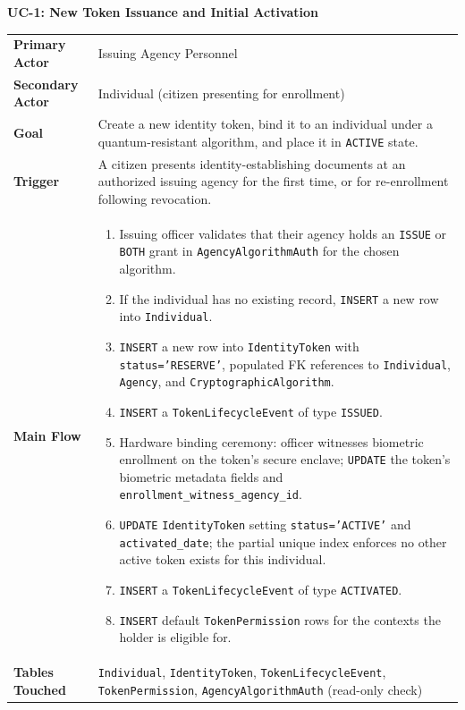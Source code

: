 \documentclass[11pt,letterpaper]{article}
\newcommand{\entity}[1]{\texttt{\color{navydark}#1}}
\newcommand{\usecase}[2]{%
  \needspace{3\baselineskip}%
  \vspace{6pt}%
  \noindent\colorbox{tabheader}{\parbox{\dimexpr\textwidth-2\fboxsep}{%
    \color{white}\small\bfseries\textsc{#1:} \mdseries #2}}%
  \nopagebreak[4]%
  \vspace{2pt}%
  \nopagebreak[4]%
}
\begin{document}
\usecase{UC-1}{New Token Issuance and Initial Activation}
\noindent\begin{xltabular}{\textwidth}{>{\bfseries}p{1.4in} >{\RaggedRight\arraybackslash}X}
Primary Actor & Issuing Agency Personnel \\
Secondary Actor & Individual (citizen presenting for enrollment) \\
Goal & Create a new identity token, bind it to an individual under a quantum-resistant algorithm, and place it in \texttt{ACTIVE} state. \\
Trigger & A citizen presents identity-establishing documents at an authorized issuing agency for the first time, or for re-enrollment following revocation. \\
Main Flow &
\begin{enumerate}
  \item Issuing officer validates that their agency holds an \texttt{ISSUE} or \texttt{BOTH} grant in \entity{AgencyAlgorithmAuth} for the chosen algorithm.
  \item If the individual has no existing record, \texttt{INSERT} a new row into \entity{Individual}.
  \item \texttt{INSERT} a new row into \entity{IdentityToken} with \texttt{status='RESERVE'}, populated FK references to \entity{Individual}, \entity{Agency}, and \entity{CryptographicAlgorithm}.
  \item \texttt{INSERT} a \entity{TokenLifecycleEvent} of type \texttt{ISSUED}.
  \item Hardware binding ceremony: officer witnesses biometric enrollment on the token's secure enclave; \texttt{UPDATE} the token's biometric metadata fields and \texttt{enrollment\_witness\_agency\_id}.
  \item \texttt{UPDATE} \entity{IdentityToken} setting \texttt{status='ACTIVE'} and \texttt{activated\_date}; the partial unique index enforces no other active token exists for this individual.
  \item \texttt{INSERT} a \entity{TokenLifecycleEvent} of type \texttt{ACTIVATED}.
  \item \texttt{INSERT} default \entity{TokenPermission} rows for the contexts the holder is eligible for.
\end{enumerate} \\
Tables Touched & \entity{Individual}, \entity{IdentityToken}, \entity{TokenLifecycleEvent}, \entity{TokenPermission}, \entity{AgencyAlgorithmAuth} (read-only check) \\
\end{xltabular}
\end{document}
